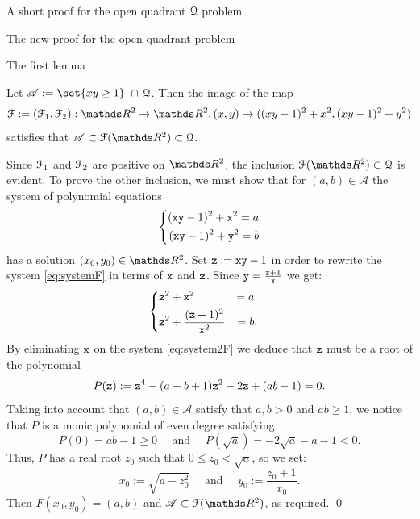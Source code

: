 \documentclass[11pt, a4paper, english, twoside, notitlepage, openright]{report}
\begin{document}
\begin{chapter}{A short proof for the open quadrant $\mathcal{Q}$ problem}
\begin{section}{The new proof for the open quadrant problem}
\begin{subsection}{The first lemma}
\begin{lemma}\label{lemma1}
Let $\mathscr{A}:=\set{xy\ge1}\ \cap\, \Qu$. Then the image of the map
$$
\FF:=(\FF_1,\FF_2):\R^2\to\R^2,(x,y)\mapsto((xy-1)^2+x^2,(xy-1)^2+y^2)
$$
satisfies that $\mathscr{A}\subset\FF(\R^2)\subset\Qu$.
\begin{Proof}
Since $\mathcal{F}_1$ and $\mathcal{F}_2$ are positive on $\R^2$, the inclusion $\FF(\R^2) \subset \Qu$ is evident. To prove the other inclusion, we must show that for $(a,b)\in\mathscr{A}$ the system of polynomial equations
\begin{equation}\label{eq:systemF}
\left\{
\begin{aligned}
({\tt x}{\tt y}-1)^2+{\tt x}^2=a\\
({\tt x}{\tt y}-1)^2+{\tt y}^2=b\\
\end{aligned}
\right.
\end{equation}
has a solution $(x_0,y_0)\in\R^2$. Set ${\tt z}:={\tt x}{\tt y}-1$ in order to rewrite the system \ref{eq:systemF} in terms of ${\tt x}$ and ${\tt z}$. Since ${\tt y}=\frac{{\tt z}+1}{{\tt x}}$ we get:
\begin{equation}\label{eq:system2F}
\left\{
\begin{aligned}
&{\tt z}^2+{\tt x}^2&=a\\
&{\tt z}^2+\frac{({\tt z}+1)^2}{{\tt x}^2}&=b&.\\
\end{aligned}
\right.
\end{equation}
By eliminating ${\tt x}$ on the system \ref{eq:system2F} we deduce that ${\tt z}$ must be a root of the polynomial
$$
P({\tt z}):={\tt z}^4-(a+b+1){\tt z}^2-2{\tt z}+(ab-1)=0.
$$
Taking into account that $(a,b)\in\mathscr{A}$ satisfy that $a,b>0$ and $ab\ge1$, we notice that $P$ is a monic polynomial of even degree satisfying
$$
P(0)=ab-1\ge0\quad\text{ and }\quad P(\sqrt{a})=-2\sqrt{a}-a-1<0.
$$
Thus, $P$ has a real root $z_0$ such that $0\le z_0<\sqrt{a}$, so we set:
$$
x_0:=\sqrt{a-z_0^2}\quad \text{ and } \quad y_0:= \frac{z_0+1}{x_0}.
$$
Then $F(x_0,y_0)=(a,b)$ and $\mathscr{A}\subset\FF(\R^2)$, as required.
\qed
\end{Proof}
\end{lemma}
\end{subsection}


\end{section}
\end{chapter}
\end{document}
